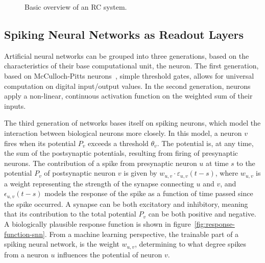 \begin{figure}[ht]
  \centering
  \caption{Basic overview of an RC system.}
\label{fig:rc-system}
\end{figure}



\subsection{Spiking Neural Networks as Readout Layers}


Artificial neural networks can be grouped into three generations, based on the
characteristics of their base computational unit, the neuron. The first
generation, based on McCulloch-Pitts neurons~\cite{McCulloch1943}, simple
threshold gates, allows for universal computation on digital input/output
values. In the second generation, neurons apply a non-linear, continuous
activation function on the weighted sum of their inputs.

The third generation of networks bases itself on spiking neurons, which model
the interaction between biological neurons more closely. In this model, a neuron
$v$ fires when its potential $P_v$ exceeds a threshold $\theta_v$. The potential
is, at any time, the sum of the postsynaptic potentials, resulting from firing
of presynaptic neurons. The contribution of a spike from presynaptic neuron $u$
at time $s$ to the potential $P_v$ of postsynaptic neuron $v$ is given by
$w_{u,v} \cdot \varepsilon_{u,v}(t-s)$, where $w_{u,v}$ is a weight representing
the strength of the synapse connecting $u$ and $v$, and $\epsilon_{u,v}(t-s)$
models the response of the spike as a function of time passed since the spike
occurred. A synapse can be both excitatory and inhibitory, meaning that its
contribution to the total potential $P_v$ can be both positive and negative. A
biologically plausible response function is shown in
figure~\ref{fig:response-function-snn}. From a machine learning perspective, the
trainable part of a spiking neural network, is the weight $w_{u,v}$, determining
to what degree spikes from a neuron $u$ influences the potential of neuron $v$.

